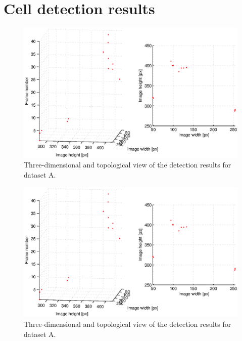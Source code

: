 \chapter{Cell detection results}
	\label{app:appendix_detectionresults}

\begin{figure}
	\includegraphics[width=\textwidth]{images/fig_results_detector_sequences_1}
	\caption{Three-dimensional and topological view of the detection results for dataset A.}
	\label{fig:results_detector_sequences_1}
\end{figure}
\begin{figure}
	\includegraphics[width=\textwidth]{images/fig_results_detector_sequences_1}
	\caption{Three-dimensional and topological view of the detection results for dataset A.}
	\label{fig:results_detector_sequences_2}
\end{figure}

